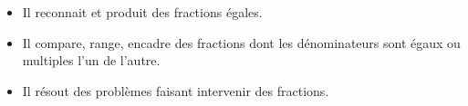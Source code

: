 \begin{prerequis}[Objectifs de 5\up{e}]  
    \begin{itemize}  
        \item Il reconnait et produit des fractions égales.
        \item Il compare, range, encadre des fractions dont les dénominateurs sont égaux ou multiples l'un de l'autre.
        \columnbreak
        \item Il résout des problèmes faisant intervenir des fractions.          
    \end{itemize}
\end{prerequis}